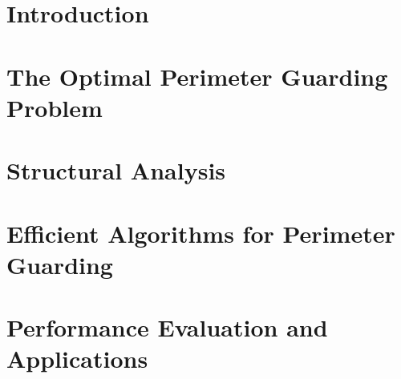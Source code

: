


\def\R{\mathcal R}
\def\C{\mathcal C}
\def\S{\mathcal S}
\def\P{\mathcal P}
\def\G{\mathcal G}
\def\W{\mathcal W}
\def\opg{{\sc {OPG}}\xspace}

\newenvironment{remark}{\noindent\textbf{Remark.} }{\hfill$\triangle$}




\section{Introduction}\label{section:opg-introduction}


\section{The Optimal Perimeter Guarding Problem}\label{section:opg-problem}


\section{Structural Analysis}\label{section:opg-analysis}


\section{Efficient Algorithms for Perimeter Guarding}\label{section:opg-algorithm}


\section{Performance Evaluation and Applications}\label{section:opg-evaluation}


